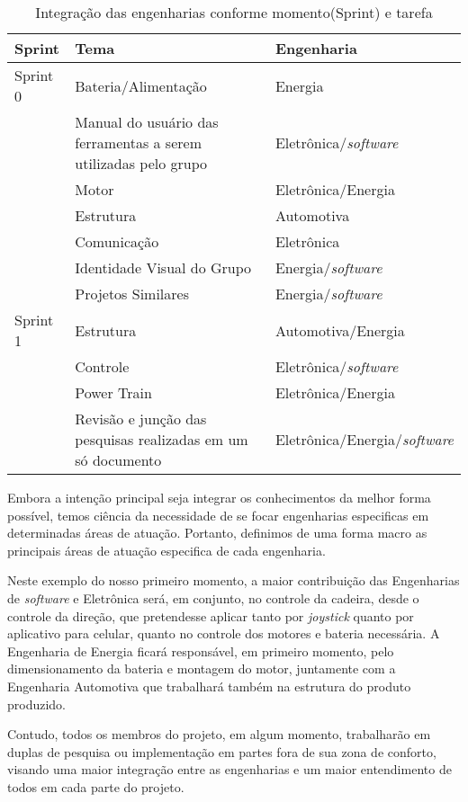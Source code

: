 \begin{table}[!ht]
\centering
\caption{Integração das engenharias conforme momento(Sprint) e tarefa}
\begin{tabular}{|p{2cm}|p{6cm}|p{5cm}|}
\hline
Sprint & Tema & Engenharia \\ \hline
Sprint 0 & Bateria/Alimentação & Energia \\ \hline
 & Manual do usuário das ferramentas a serem utilizadas pelo grupo & Eletrônica/\textit{software} \\ \hline
 & Motor & Eletrônica/Energia \\ \hline
 & Estrutura & Automotiva \\ \hline
 & Comunicação & Eletrônica \\ \hline
 & Identidade Visual do Grupo & Energia/\textit{software} \\ \hline
 & Projetos Similares & Energia/\textit{software} \\ \hline
Sprint 1 & Estrutura & Automotiva/Energia \\ \hline
 & Controle & Eletrônica/\textit{software} \\ \hline
 & Power Train & Eletrônica/Energia \\ \hline
 & Revisão e junção das pesquisas realizadas em um só documento & Eletrônica/Energia/\textit{software} \\ \hline
\end{tabular}
\label{tab:integracao}
\end{table}

Embora a intenção principal seja integrar os conhecimentos da melhor forma possível, temos ciência da necessidade de se focar engenharias especificas em determinadas áreas de atuação. Portanto, definimos de uma forma macro as principais áreas de atuação especifica de cada engenharia.

Neste exemplo do nosso primeiro momento, a maior contribuição das Engenharias de \textit{software} e Eletrônica será, em conjunto, no controle da cadeira, desde o controle da direção, que pretendesse aplicar tanto por \textit{joystick} quanto por aplicativo para celular, quanto no controle dos motores e bateria necessária. A Engenharia de Energia ficará responsável, em primeiro momento, pelo dimensionamento da bateria e montagem do motor, juntamente com a Engenharia Automotiva que trabalhará também na estrutura do produto produzido.

Contudo, todos os membros do projeto, em algum momento, trabalharão em duplas de pesquisa ou implementação em partes fora de sua zona de conforto, visando uma maior integração entre as engenharias e um maior entendimento de todos em cada parte do projeto.
